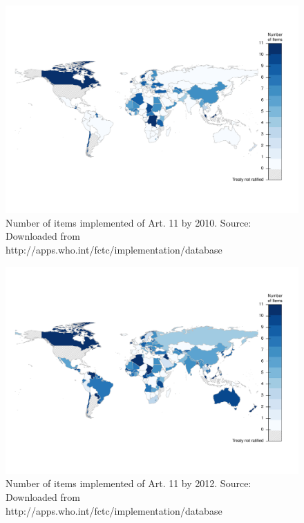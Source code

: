 \documentclass[10pt]{article}
\begin{document}
\begin{landscape}
\begin{figure}[H]
\centering
\includegraphics[width=.95\linewidth]{../fig/implementation_art11_map2010.pdf}
\caption{Number of items implemented of Art. 11 by 2010. Source: Downloaded
from http://apps.who.int/fctc/implementation/database}
\end{figure}

\begin{figure}[H]
\centering
\includegraphics[width=.95\linewidth]{../fig/implementation_art11_map2012.pdf}
\caption{Number of items implemented of Art. 11 by 2012. Source: Downloaded
from http://apps.who.int/fctc/implementation/database}
\end{figure}

\end{landscape}
\end{document}
